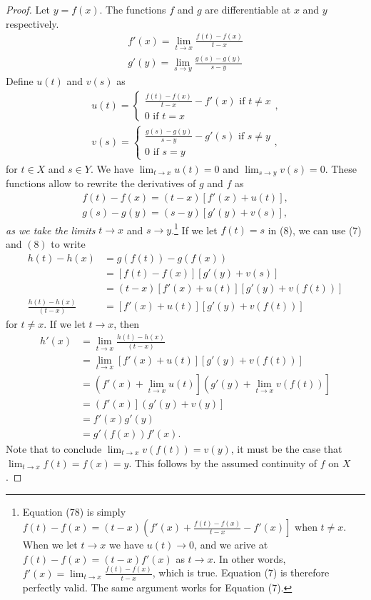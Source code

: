 \documentclass{article}
\newcommand{\g}{\mathbf{g}}
\theoremstyle{definition}
\begin{document}
	\begin{proof}
		Let $ y=f(x) $. The functions $ f $ and $ g $ are differentiable at $ x $ and $ y $ respectively. 
		\begin{align*}
			f'(x)=\lim_{t\to x}\frac{f(t)-f(x)}{t-x}\\g'(y)=\lim_{s\to y}\frac{g(s)-g(y)}{s-y}
		\end{align*}
		Define $ u(t) $ and $ v(s) $ as 
		\begin{align*}
			u(t)=\begin{cases}
				\frac{f(t)-f(x)}{t-x}-f'(x)\text{ if }t\neq x\\
				0\text{ if }t=x
			\end{cases},\\
			v(s)=\begin{cases}
				\frac{g(s)-g(y)}{s-y}-g'(s)\text{ if }s\neq y\\
				0\text{ if }s=y
			\end{cases},
		\end{align*}
		for $ t\in X $ and $ s\in Y $. We have $ \lim_{t\to x}u(t)=0 $ and $ \lim_{s\to y}v(s)=0 $. These functions allow to rewrite the derivatives of $ g $ and $ f $ as \begin{align}
			f(t)-f(x)=(t-x)[f'(x)+u(t)],\\g(s)-g(y)=(s-y)[g'(y)+v(s)],
		\end{align}
		\textit{as we take the limits} $ t\to x $ and $ s\to y $.\footnote{Equation (78) is simply $ f(t)-f(x)=(t-x)\left(f'(x)+\frac{f(t)-f(x)}{t-x}-f'(x)\right] $ when $ t\neq x $. When we let $ t\to x $ we have $ u(t)\to 0 $, and we arive at $ f(t)-f(x)=(t-x)f'(x) $ as $ t\to x  $. In other words, $ f'(x)=\lim_{t\to x}\frac{f(t)-f(x)}{t-x} $, which is true. Equation (7) is therefore perfectly valid. The same argument works for Equation (7).}
		If we let $ f(t)=s $ in (8), we can use (7) and $ (8) $ to write
		\begin{align*}
			h(t)-h(x)&=g(f(t))-g(f(x))\\&=[f(t)-f(x)][g'(y)+v(s)]\\&=(t-x)[f'(x)+u(t)][g'(y)+v(f(t))]\\\frac{h(t)-h(x)}{(t-x)}&=[f'(x)+u(t)][g'(y)+v(f(t))]
		\end{align*}
		for $ t\neq x $. If we let $ t\to x $, then 
		\begin{align*}
			h'(x)&=\lim_{t\to x}\frac{h(t)-h(x)}{(t-x)}\\&=\lim_{t\to x}[f'(x)+u(t)][g'(y)+v(f(t))]	\\ &=\left(f'(x)+\lim_{t\to x}u(t)\right]\left(g'(y)+\lim_{t\to x}v(f(t))
			\right]\\ &=\left(f'(x)\right]\left(g'(y)+v(y)\right]\\&=f'(x)g'(y)\\&=g'(f(x))f'(x).\end{align*}
		Note that to conclude $ \lim_{t\to x}v(f(t))=v(y) $, it must be the case that $ \lim_{t\to x}f(t)=f(x)=y $. This follows by the assumed continuity of $ f $ on $ X $. 
	\end{proof}
\end{document}
